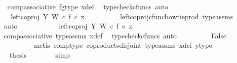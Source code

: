 \begin{isabellebody}
\ \ comp{\isacharunderscore}{\kern0pt}associative{}\ fg{\isacharunderscore}{\kern0pt}type\ x{\isacharunderscore}{\kern0pt}def\ \isamarkupfalse%
\ {\isacharparenleft}{\kern0pt}typecheck{\isacharunderscore}{\kern0pt}cfuncs{\isacharcomma}{\kern0pt}\ auto{\isacharparenright}{\kern0pt}\isanewline
\ \ \ \ \ \ \isamarkupfalse%
\ \isamarkupfalse%
\ {\isachardoublequoteopen}{\isachardot}{\kern0pt}{\isachardot}{\kern0pt}{\isachardot}{\kern0pt}\ {\isacharequal}{\kern0pt}\ {\isacharparenleft}{\kern0pt}left{\isacharunderscore}{\kern0pt}coproj\ Y\ W\ {\isasymcirc}\isactrlsub c\ f{\isacharparenright}{\kern0pt}\ {\isasymcirc}\isactrlsub c\ x{\isachardoublequoteclose}\isanewline
\ \ \ \ \ \ \ \ \isamarkupfalse%
\ left{\isacharunderscore}{\kern0pt}coproj{\isacharunderscore}{\kern0pt}cfunc{\isacharunderscore}{\kern0pt}bowtie{\isacharunderscore}{\kern0pt}prod\ type{\isacharunderscore}{\kern0pt}assms\ \isamarkupfalse%
\ auto\isanewline
\ \ \ \ \ \ \isamarkupfalse%
\ \isamarkupfalse%
\ {\isachardoublequoteopen}{\isachardot}{\kern0pt}{\isachardot}{\kern0pt}{\isachardot}{\kern0pt}\ {\isacharequal}{\kern0pt}\ left{\isacharunderscore}{\kern0pt}coproj\ Y\ W\ {\isasymcirc}\isactrlsub c\ f\ {\isasymcirc}\isactrlsub c\ x{\isachardoublequoteclose}\isanewline
\ \ \ \ \ \ \ \ \isamarkupfalse%
\ comp{\isacharunderscore}{\kern0pt}associative{}\ type{\isacharunderscore}{\kern0pt}assms{\isacharparenleft}{\kern0pt}{}{\isacharparenright}{\kern0pt}\ x{\isacharunderscore}{\kern0pt}def\ \isamarkupfalse%
\ {\isacharparenleft}{\kern0pt}typecheck{\isacharunderscore}{\kern0pt}cfuncs{\isacharcomma}{\kern0pt}\ auto{\isacharparenright}{\kern0pt}\isanewline
\ \ \ \ \ \ \isamarkupfalse%
\ \isamarkupfalse%
\ False\isanewline
\ \ \ \ \ \ \ \ \isamarkupfalse%
\ {\isacharparenleft}{\kern0pt}metis\ comp{\isacharunderscore}{\kern0pt}type\ coproducts{\isacharunderscore}{\kern0pt}disjoint\ type{\isacharunderscore}{\kern0pt}assms{\isacharparenleft}{\kern0pt}{}{\isacharparenright}{\kern0pt}\ x{\isacharunderscore}{\kern0pt}def\ y{\isacharunderscore}{\kern0pt}type{}{\isacharparenright}{\kern0pt}\isanewline
\ \ \ \ \isamarkupfalse%
\isanewline
\ \ \ \ \isamarkupfalse%
\ \isamarkupfalse%
\ {\isacharquery}{\kern0pt}thesis\isanewline
\ \ \ \ \ \ \isamarkupfalse%
\ simp\isanewline
{}\isamarkupfalse%

\end{isabellebody}
